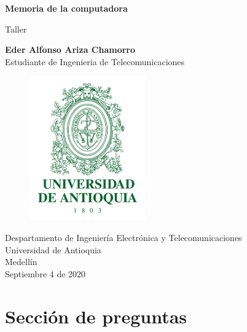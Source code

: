 \documentclass{article}
\begin{document}
	
\begin{titlepage}
	
    \begin{center}
    	
    	\vspace*{1cm}
    	
    	\Huge
    	\textbf{Memoria de la computadora}
    	
    	\vspace{0.5cm}
         
         \LARGE
         Taller
         
        \vspace{0.5cm}
        
    	\LARGE
    	\textbf{Eder Alfonso Ariza Chamorro}\\
    	Estudiante de Ingenieria de Telecomunicaciones\\
    	
    	\vspace*{1.5cm}
		
    	\begin{figure}[h]
    		\includegraphics[width=5cm]{Logo UdeA.png}
    		\centering
    		\label{fig:Logo UdeA}
    	\end{figure}
    
    	\vspace*{2cm}
    	
    	\Large
    	Despartamento de Ingeniería Electrónica y Telecomunicaciones\\
    	Universidad de Antioquia\\
    	Medellín\\
    	Septiembre 4 de 2020
    	
	\end{center}

\end{titlepage}


\tableofcontents
\newpage
\section{Sección de preguntas}\label{contenido}
\end{document}
